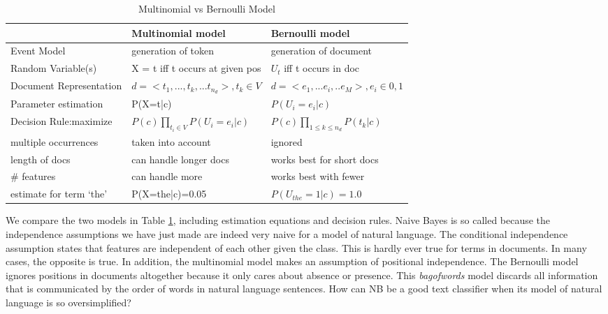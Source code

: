 \documentclass[journal]{IEEEtran}
\begin{document}
\begin{table}[H]
	\caption{Multinomial vs Bernoulli Model}
		\label{Multinomial vs Bernoulli Model}
	\hspace{1pt}
	\setlength{\tabcolsep}{2pt}
	\renewcommand{\arraystretch}{2}
	\begin{tabular}{|p{2cm}|p{3cm}|p{3cm}|}
		\hline
		& \textbf{Multinomial model} & \textbf{Bernoulli model}\\
		\hline
		Event Model & generation of token & generation of document\\
		\hline
		Random Variable(s)& X = t iff t occurs at given pos & $U_{t}$ iff t occurs in doc\\
		\hline
		Document Representation & $d=<t_{1},...,t_{k},...t_{n_{d}}>,t_{k} \in V $& $d=<e_{1},...e_{i},..e_{M}>, e_{i} \in {0,1}$\\
		\hline
		Parameter estimation & P(X=t|c) & $P(U_{i}=e_{i}|c)$\\
		\hline
		Decision Rule:maximize& $P(c)\prod_{t_{i}\in V}P(U_i=e_i|c)$ & $P(c)\prod_{1\le k \le n_d}P(t_k|c)$\\
		\hline
		multiple occurrences & taken into account & ignored\\
		\hline
		length of docs & can handle longer docs & works best for short docs\\
		\hline
		\# features & can handle more & works best with fewer\\
		\hline
		estimate for term `the'& P(X=the|c)=0.05 & $P(U_{the}=1|c)=1.0$\\
		\hline
	\end{tabular}
\end{table}\vspace{-2pt}
We compare the two models in Table \ref{Multinomial vs Bernoulli Model}, including estimation equations and decision rules. Naive Bayes is so called because the independence assumptions we have just made are indeed very naive for a model of natural language. The conditional independence assumption states that features are independent of each other given the class. This is hardly ever true for terms in documents. In many cases, the opposite is true. In addition, the multinomial model makes an assumption of positional independence. The Bernoulli model ignores positions in documents altogether because it only cares about absence or presence. This \textit{bagofwords} model discards all information that is communicated by the order of words in natural language sentences. How can NB be a good text classifier when its model of natural language is so oversimplified?
\end{document}
